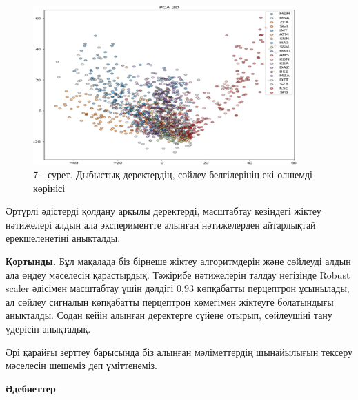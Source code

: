\begin{figure}[H]
	\centering
	\includegraphics[width=0.9\textwidth]{media/ict/image12}
	\caption*{7 - сурет. Дыбыстық деректердің, сөйлеу белгілерінің екі өлшемді көрінісі}
\end{figure}

\begin{multicols}{2}
Әртүрлі әдістерді қолдану арқылы деректерді, масштабтау кезіндегі жіктеу
нәтижелері алдын ала экспериментте алынған нәтижелерден айтарлықтай
ерекшеленетіні анықталды.

{\bfseries Қортынды.} Бұл мақалада біз бірнеше жіктеу алгоритмдерін және
сөйлеуді алдын ала өңдеу мәселесін қарастырдық. Тәжірибе нәтижелерін
талдау негізінде Robust scaler әдісімен масштабтау үшін дәлдігі 0,93
көпқабатты перцептрон ұсынылады, ал сөйлеу сигналын көпқабатты
перцептрон көмегімен жіктеуге болатындығы анықталды. Содан кейін алынған
деректерге сүйене отырып, сөйлеушіні тану үдерісін анықтадық.

Әрі қарайғы зерттеу барысында біз алынған мәліметтердің шынайылығын
тексеру мәселесін шешеміз деп үміттенеміз.
\end{multicols}

\begin{center}
{\bfseries Әдебиеттер}
\end{center}

